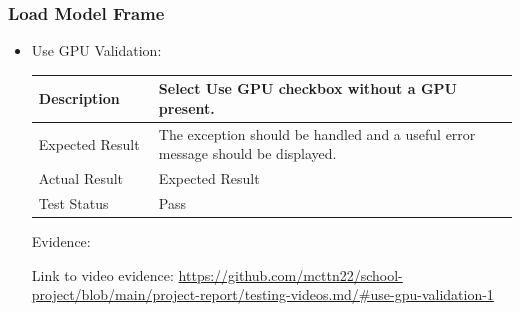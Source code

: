 \documentclass[./project-report/src/latex/project-report.tex]{subfiles}
\begin{document}
\pagebreak

\subsubsection{Load Model Frame}
\label{sec:load-model-frame-input-validation}
\begin{itemize}
	\item Use GPU Validation: \newline\newline
		\begin{tabular}{|p{0.25\linewidth}|p{0.75\linewidth}|}
			\hline
			Description & Select Use GPU checkbox without a GPU present. \\
			\hline
			Expected Result & The exception should be handled and a useful error message should be displayed. \\
			\hline
			Actual Result & Expected Result \\
			\hline
			Test Status & Pass \\
			\hline
		\end{tabular}
		
		\vspace{5mm}

		Evidence:
		\begin{figure}[h!]
		\centering
		\end{figure}

		Link to video evidence: \url{https://github.com/mcttn22/school-project/blob/main/project-report/testing-videos.md/#use-gpu-validation-1}
\end{itemize}
\end{document}
